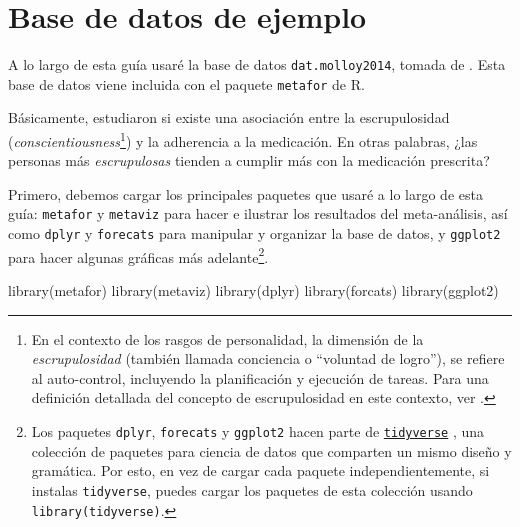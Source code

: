 \documentclass[
  bookmarksnumbered]{article}
\newenvironment{Shaded}{\begin{snugshade}}{\end{snugshade}}
\newcommand{\FunctionTok}[1]{\textcolor[rgb]{0.39,0.29,0.61}{#1}}
\newcommand{\NormalTok}[1]{\textcolor[rgb]{0.12,0.11,0.11}{#1}}
\begin{document}
\hypertarget{base-de-datos-de-ejemplo}{%
\section{Base de datos de ejemplo}\label{base-de-datos-de-ejemplo}}

A lo largo de esta guía usaré la base de datos \texttt{dat.molloy2014}, tomada de \textcite{molloy2013}. Esta base de datos viene incluida con el paquete \texttt{metafor} de R.

Básicamente, \textcite{molloy2013} estudiaron si existe una asociación entre la escrupulosidad (\emph{conscientiousness}\footnote{En el contexto de los rasgos de personalidad, la dimensión de la \emph{escrupulosidad} (también llamada conciencia o ``voluntad de logro''), se refiere al auto-control, incluyendo la planificación y ejecución de tareas. Para una definición detallada del concepto de escrupulosidad en este contexto, ver \textcite{johnBigFiveTrait1999}.}) y la adherencia a la medicación. En otras palabras, ¿las personas más \emph{escrupulosas} tienden a cumplir más con la medicación prescrita?

Primero, debemos cargar los principales paquetes que usaré a lo largo de esta guía: \texttt{metafor} \autocite{viechtbauer2010} y \texttt{metaviz} \autocite{KossmeierMetaviz} para hacer e ilustrar los resultados del meta-análisis, así como \texttt{dplyr} \autocite{WickhamDplyr2021} y \texttt{forecats} \autocite{Wickhamforcats2022} para manipular y organizar la base de datos, y \texttt{ggplot2} \autocite{Wickhamggplot22016} para hacer algunas gráficas más adelante\footnote{Los paquetes \texttt{dplyr}, \texttt{forecats} y \texttt{ggplot2} hacen parte de \href{https://www.tidyverse.org/}{\texttt{tidyverse}} \autocite{Wickhamtidyverse2019}, una colección de paquetes para ciencia de datos que comparten un mismo diseño y gramática. Por esto, en vez de cargar cada paquete independientemente, si instalas \texttt{tidyverse}, puedes cargar los paquetes de esta colección usando \texttt{library(tidyverse)}.}.

\begin{Shaded}
\begin{Highlighting}[]
\FunctionTok{library}\NormalTok{(metafor)}
\FunctionTok{library}\NormalTok{(metaviz)}
\FunctionTok{library}\NormalTok{(dplyr)}
\FunctionTok{library}\NormalTok{(forcats)}
\FunctionTok{library}\NormalTok{(ggplot2)}
\end{Highlighting}
\end{Shaded}
\end{document}
